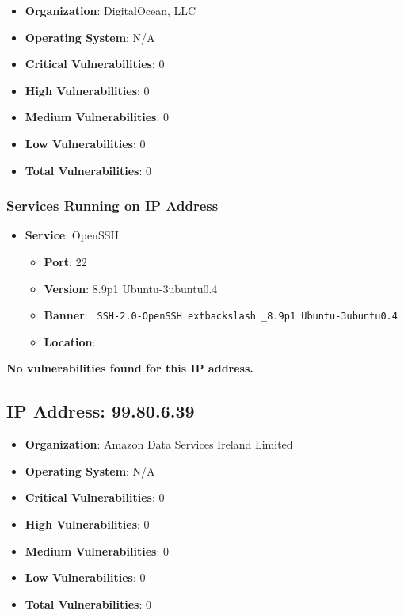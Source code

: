 \documentclass{article}
\begin{document}
\begin{itemize}
    \item \textbf{Organization}: DigitalOcean, LLC
    \item \textbf{Operating System}:  N/A 
    \item \textbf{Critical Vulnerabilities}: 0
    \item \textbf{High Vulnerabilities}: 0
    \item \textbf{Medium Vulnerabilities}: 0
    \item \textbf{Low Vulnerabilities}: 0
    \item \textbf{Total Vulnerabilities}: 0
\end{itemize}

\subsubsection*{Services Running on IP Address}

\begin{itemize}
    
        \item \textbf{Service}: OpenSSH
        \begin{itemize}
            \item \textbf{Port}: 22
            \item \textbf{Version}:  8.9p1 Ubuntu-3ubuntu0.4 
            \item \textbf{Banner}: \texttt{ SSH-2.0-OpenSSH	extbackslash _8.9p1 Ubuntu-3ubuntu0.4 }
            \item \textbf{Location}: \href{  }{  }
        \end{itemize}
    
\end{itemize}


\textbf{No vulnerabilities found for this IP address.}


\clearpage



\subsection*{IP Address: 99.80.6.39}

\begin{itemize}
    \item \textbf{Organization}: Amazon Data Services Ireland Limited
    \item \textbf{Operating System}:  N/A 
    \item \textbf{Critical Vulnerabilities}: 0
    \item \textbf{High Vulnerabilities}: 0
    \item \textbf{Medium Vulnerabilities}: 0
    \item \textbf{Low Vulnerabilities}: 0
    \item \textbf{Total Vulnerabilities}: 0
\end{itemize}
\end{document}
